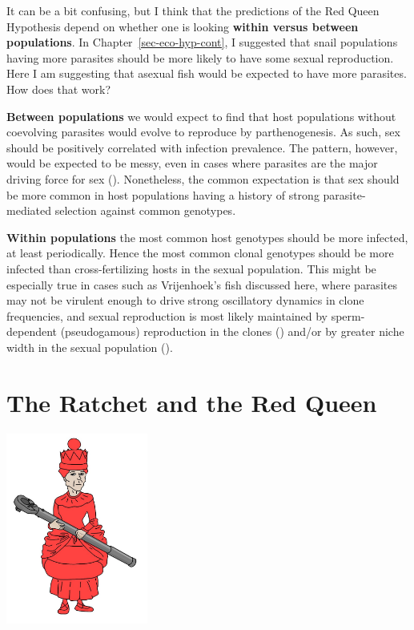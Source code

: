 \documentclass[
  letterpaper,
]{book}
\begin{document}
It can be a bit confusing, but I think that the predictions of the Red
Queen Hypothesis depend on whether one is looking \textbf{within versus
between populations}. In Chapter~\ref{sec-eco-hyp-cont}, I suggested
that snail populations having more parasites should be more likely to
have some sexual reproduction. Here I am suggesting that asexual fish
would be expected to have more parasites. How does that work?

\textbf{Between populations} we would expect to find that host
populations without coevolving parasites would evolve to reproduce by
parthenogenesis. As such, sex should be positively correlated with
infection prevalence. The pattern, however, would be expected to be
messy, even in cases where parasites are the major driving force for sex
(). Nonetheless,
the common expectation is that sex should be more common in host
populations having a history of strong parasite-mediated selection
against common genotypes.

\textbf{Within populations} the most common host genotypes should be
more infected, at least periodically. Hence the most common clonal
genotypes should be more infected than cross-fertilizing hosts in the
sexual population. This might be especially true in cases such as
Vrijenhoek's fish discussed here, where parasites may not be virulent
enough to drive strong oscillatory dynamics in clone frequencies, and
sexual reproduction is most likely maintained by sperm-dependent
(pseudogamous) reproduction in the clones
() and/or by greater niche
width in the sexual population ().


\chapter{The Ratchet and the Red Queen}\label{sec-chap6}

\begin{center}
\includegraphics[width=0.35\textwidth,height=\textheight]{images/fig6-1.jpeg}
\end{center}
\end{document}
